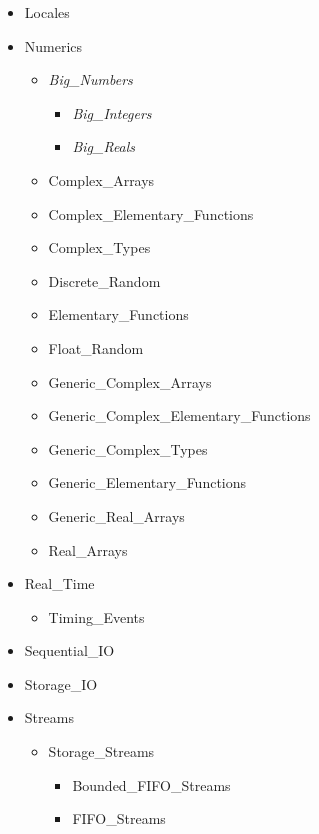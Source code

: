\documentclass[english]{article}
\begin{document}
\begin{scriptsize}
\begin{multicols*}{5}
\begin{itemize}[leftmargin=0mm]
\begin{itemize}[leftmargin=5mm]
      \item[] Locales
      \item[] Numerics
         \begin{itemize}[leftmargin=5mm]
            \item[] \textit{Big\_Numbers}
               \begin{itemize}[leftmargin=5mm]
                  \item[] \textit{Big\_Integers}
                  \item[] \textit{Big\_Reals}
               \end{itemize}
            \item[] Complex\_Arrays
            \item[] Complex\_Elementary\_Functions
            \item[] Complex\_Types
            \item[] Discrete\_Random
            \item[] Elementary\_Functions
            \item[] Float\_Random
            \item[] Generic\_Complex\_Arrays
            \item[] Generic\_Complex\_Elementary\_Functions
            \item[] Generic\_Complex\_Types
            \item[] Generic\_Elementary\_Functions
            \item[] Generic\_Real\_Arrays
            \item[] Real\_Arrays
         \end{itemize}
      \item[] Real\_Time
         \begin{itemize}[leftmargin=5mm]
            \item[] Timing\_Events
         \end{itemize}
      \item[] Sequential\_IO
      \item[] Storage\_IO
      \item[] Streams
         \begin{itemize}[leftmargin=5mm]
            \item[] Storage\_Streams
            \begin{itemize}[leftmargin=5mm]
               \item[] Bounded\_FIFO\_Streams
               \item[] FIFO\_Streams
            \end{itemize}

\end{itemize}
\end{itemize}
\end{itemize}
\end{multicols*}
\end{scriptsize}
\end{document}
